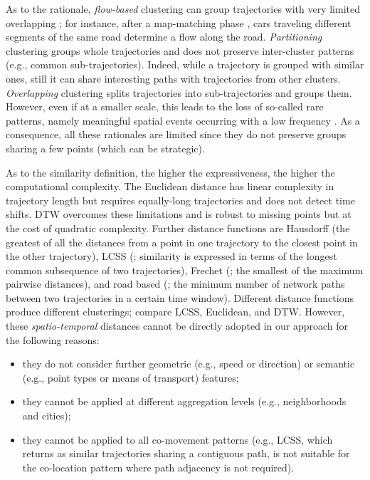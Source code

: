 \documentclass[
]{ceurart}
\begin{document}
As to the rationale, \textit{flow-based} clustering can group trajectories with very limited overlapping \citep{DBLP:conf/icdcs/HanLO12,DBLP:journals/tmc/HanLO15}; for instance, after a map-matching phase \citep{DBLP:conf/mipro/FranciaGV19}, cars traveling different segments of the same road determine a flow along the road.
\textit{Partitioning} clustering groups whole trajectories \citep{DBLP:journals/tkde/HanLO17,DBLP:journals/tits/KumarWRLKP18,DBLP:journals/pvldb/WangBCSQ19} and does not preserve inter-cluster patterns (e.g., common sub-trajectories).
Indeed, while a trajectory is grouped with similar ones, still it can share interesting paths with trajectories from other clusters.
\textit{Overlapping} clustering \citep{DBLP:conf/sigmod/LeeHW07,tampakis2019scalable,ailin2019movement} splits trajectories into sub-trajectories and groups them.
However, even if at a smaller scale, this leads to the loss of so-called rare patterns, namely meaningful spatial events occurring with a low frequency \citep{DBLP:journals/tkdd/KohR16}.
As a consequence, all these rationales are limited since they do not preserve groups sharing a few points (which can be strategic).

As to the similarity definition, the higher the expressiveness, the higher the computational complexity.
The Euclidean distance \citep{van1995some} has linear complexity in trajectory length but requires equally-long trajectories and does not detect time shifts. 
DTW \citep{DBLP:conf/kdd/RakthanmanonCMBWZZK12} overcomes these limitations and is robust to missing points but at the cost of quadratic complexity.
Further distance functions are Hausdorff \citep{DBLP:journals/tip/SimKP99} (the greatest of all the distances from a point in one trajectory to the closest point in the other trajectory), LCSS (\cite{DBLP:conf/icde/VlachosGK02}; similarity is expressed in terms of the longest common subsequence of two trajectories), Frechet (\cite{DBLP:conf/pods/AgarwalFMNPT18}; the smallest of the maximum pairwise distances), and road based (\cite{DBLP:conf/mdm/SilvaLMZC20}; the minimum number of network paths between two trajectories in a certain time window).
Different distance functions produce different clusterings; \cite{DBLP:conf/icde/VlachosGK02} compare LCSS, Euclidean, and DTW.
However, these \textit{spatio-temporal} distances cannot be directly adopted in our approach for the following reasons:
\begin{itemize}
\item they do not consider further geometric (e.g., speed or direction) or semantic (e.g., point types or means of transport) features;
\item they cannot be applied at different aggregation levels (e.g., neighborhoods and cities);
\item they cannot be applied to all co-movement patterns (e.g., LCSS, which returns as similar trajectories sharing a contiguous path, is not suitable for the co-location pattern where path adjacency is not required).
\end{itemize}
\end{document}
